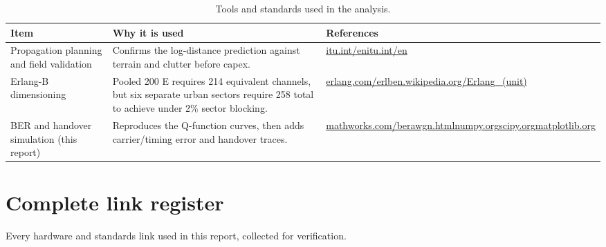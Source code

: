 \documentclass[9pt,a4paper]{extarticle}
\newcommand{\ulinkurl}[1]{#1}
\begin{document}
\begin{table}[H]\centering\footnotesize
\caption{Tools and standards used in the analysis.}
\begin{tabularx}{\textwidth}{@{}p{4.3cm}Xp{6.2cm}@{}}
\toprule
\textbf{Item} & \textbf{Why it is used} & \textbf{References} \\
\midrule
Propagation planning and field validation & Confirms the log-distance prediction against terrain and clutter before capex. & \href{https://www.itu.int/rec/R-REC-P.1546/en}{\ulinkurl{itu.int/en}}\newline\href{https://www.itu.int/rec/R-REC-P.2109/en}{\ulinkurl{itu.int/en}} \\ \midrule
Erlang-B dimensioning & Pooled 200 E requires 214 equivalent channels, but six separate urban sectors require 258 total to achieve under 2\% sector blocking. & \href{https://www.erlang.com/calculator/erlb/}{\ulinkurl{erlang.com/erlb}}\newline\href{https://en.wikipedia.org/wiki/Erlang_(unit)}{\ulinkurl{en.wikipedia.org/Erlang\_(unit)}} \\ \midrule
BER and handover simulation (this report) & Reproduces the Q-function curves, then adds carrier/timing error and handover traces. & \href{https://www.mathworks.com/help/comm/ref/berawgn.html}{\ulinkurl{mathworks.com/berawgn.html}}\newline\href{https://numpy.org/}{\ulinkurl{numpy.org}}\newline\href{https://scipy.org/}{\ulinkurl{scipy.org}}\newline\href{https://matplotlib.org/}{\ulinkurl{matplotlib.org}} \\ \midrule
\bottomrule
\end{tabularx}
\end{table}

\section{Complete link register}
Every hardware and standards link used in this report, collected for verification.
\end{document}
